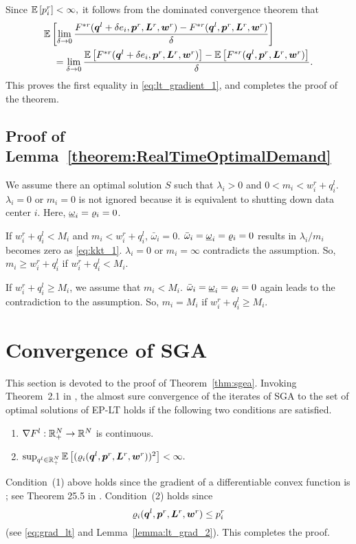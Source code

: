 Since $\mathbb{E}\left[p^r_i\right] < \infty,$ it follows from the dominated
convergence theorem that 
\begin{align*}
  &\mathbb{E}\left[\lim_{\delta \rightarrow 0} \frac{F^{*r}(\boldsymbol{q}^l + \delta
      e_i,\boldsymbol{p}^r,\boldsymbol{L}^r,\boldsymbol{w}^r) -
      F^{*r}(\boldsymbol{q}^l,\boldsymbol{p}^r,\boldsymbol{L}^r,\boldsymbol{w}^r)}{\delta}\right] \\
  &\quad =\lim_{\delta \rightarrow 0} \frac{\mathbb{E}\left[F^{*r}(\boldsymbol{q}^l + \delta
      e_i,\boldsymbol{p}^r,\boldsymbol{L}^r,\boldsymbol{w}^r)\right] -
    \mathbb{E}\left[F^{*r}(\boldsymbol{q}^l,\boldsymbol{p}^r,\boldsymbol{L}^r,\boldsymbol{w}^r)\right]}{\delta}.
\end{align*}
This proves the first equality in \eqref{eq:lt_gradient_1}, and
completes the proof of the theorem.


\subsection{Proof of Lemma~\ref{theorem:RealTimeOptimalDemand}}
\label{proof:RealTimeOptimalDemand}

 We assume there an optimal solution $S$ such that $\lambda_i>0$ and $0 < m_i < w^r_i + q^l_i$. $\lambda_i=0$ or $m_i = 0$ is not ignored because it is equivalent to shutting down data center $i$. Here, $\underbar{$\omega$}_i=\varrho_i = 0$.
 
 If $w^r_i + q^l_i < M_i$ and $m_i < w^r_i + q^l_i$, $\bar{\omega}_i = 0$. $\bar{\omega}_i = \underbar{$\omega$}_i=\varrho_i = 0$ results in $\lambda_i/m_i$ becomes zero as \eqref{eq:kkt_1}. $\lambda_i=0$ or $m_i = \infty$ contradicts the assumption. So, $m_i \geq w^r_i+q^l_i$ if $w^r_i + q^l_i < M_i$. 
 
 If $w^r_i + q^l_i \geq M_i$, we assume that $m_i < M_i$. $\bar{\omega}_i = \underbar{$\omega$}_i=\varrho_i = 0$ again leads to the contradiction to the assumption. So, $m_i=M_i$ if $w^r_i + q^l_i \geq M_i$.

\section{Convergence of SGA}
\label{sec:conv-proof}

This section is devoted to the proof of Theorem~\ref{thm:sgea}.
Invoking Theorem~2.1 in \cite{Kushner03}, the almost sure convergence
of the iterates of SGA to the set of optimal solutions of EP-LT holds
if the following two conditions are satisfied.
  \begin{enumerate}
  \item $\nabla F^l:\mathbb{R}^N_+ \rightarrow \mathbb{R}^N$ is continuous.
  \item $ \sup_{q^l \in \mathbb{R}^N_+}
    \mathbb{E}\left[(\varrho_i(\boldsymbol{q}^l,\boldsymbol{p}^r,\boldsymbol{L}^r,\boldsymbol{w}^r))^2\right]
    < \infty.$
  \end{enumerate}
  Condition~(1) above holds since the gradient of a differentiable
  convex function is  ; see Theorem 25.5 in
  \cite{Rockafellar70}. Condition~(2) holds since $$
  \varrho_i(\boldsymbol{q}^l,\boldsymbol{p}^r,\boldsymbol{L}^r,\boldsymbol{w}^r) \leq
  p^r_i$$ (see \eqref{eq:grad_lt} and
  Lemma~\ref{lemma:lt_grad_2}). This completes the proof.



